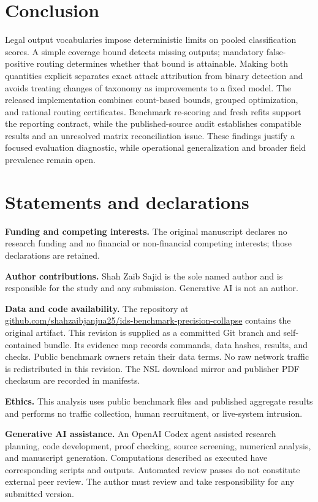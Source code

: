 \documentclass[twocolumn]{svjour3}
\begin{document}
\section{Conclusion}
Legal output vocabularies impose deterministic limits on pooled classification scores. A simple coverage bound detects missing outputs; mandatory false-positive routing determines whether that bound is attainable. Making both quantities explicit separates exact attack attribution from binary detection and avoids treating changes of taxonomy as improvements to a fixed model. The released implementation combines count-based bounds, grouped optimization, and rational routing certificates. Benchmark re-scoring and fresh refits support the reporting contract, while the published-source audit establishes compatible results and an unresolved matrix reconciliation issue. These findings justify a focused evaluation diagnostic, while operational generalization and broader field prevalence remain open.

\section{Statements and declarations}
\textbf{Funding and competing interests.} The original manuscript declares no research funding and no financial or non-financial competing interests; those declarations are retained.

\textbf{Author contributions.} Shah Zaib Sajid is the sole named author and is responsible for the study and any submission. Generative AI is not an author.

\textbf{Data and code availability.} The repository at \href{https://github.com/shahzaibjanjua25/ids-benchmark-precision-collapse}{github.com/shahzaibjanjua25/ids-benchmark-precision-collapse} contains the original artifact. This revision is supplied as a committed Git branch and self-contained bundle. Its evidence map records commands, data hashes, results, and checks. Public benchmark owners retain their data terms. No raw network traffic is redistributed in this revision. The NSL download mirror and publisher PDF checksum are recorded in manifests.

\textbf{Ethics.} This analysis uses public benchmark files and published aggregate results and performs no traffic collection, human recruitment, or live-system intrusion.

\textbf{Generative AI assistance.} An OpenAI Codex agent assisted research planning, code development, proof checking, source screening, numerical analysis, and manuscript generation. Computations described as executed have corresponding scripts and outputs. Automated review passes do not constitute external peer review. The author must review and take responsibility for any submitted version.

\begingroup\small\endgroup
\end{document}
